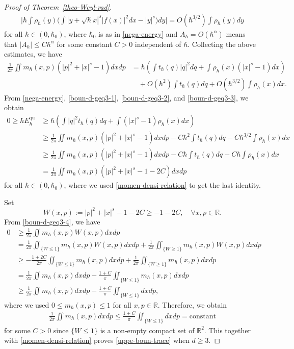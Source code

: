 \documentclass[%
11pt,  reqno]{amsart}
\theoremstyle{remarkstyle}
\newcommand{\1}{\hspace{0.2mm}\text{I}\hspace{0.2mm}}
\newcommand{\R}{\mathbb{R}}
\DeclareMathOperator*{\qua}{qu}
\numberwithin{equation}{section}
\numberwithin{theorem}{section}
\begin{document}
\begin{proof}[Proof of Theorem~\ref{theo-Weyl-rad}]
		\begin{align*}
			\Big|\hbar \int \rho_{\hbar}(y) \Big( \int |y+\sqrt{\hbar} x|^s|f(x)|^2 dx - |y|^s \Big) dy\Big| = O(\hbar^{3/2}) \int \rho_{\hbar}(y)dy
		\end{align*}
		for all $\hbar \in (0,\hbar_0)$, where $\hbar_0$ is as in \eqref{nega-energy} and $A_\hbar=O(\hbar^\alpha)$ means that $|A_\hbar|\leq C\hbar^\alpha$ for some constant $C>0$ independent of $\hbar$. Collecting the above estimates, we have
		\begin{align} 
			\frac{1}{2\pi}\iint m_{\hbar}(x,p) (|p|^2+|x|^s-1) dxdp &= \hbar \left(\int t_\hbar(q)|q|^2 dq + \int \rho_\hbar(x) (|x|^s-1) dx\right) \label{boun-d-geq3-3} \\
			&\quad + O(\hbar^2) \int t_\hbar(q) dq + O(\hbar^{3/2}) \int \rho_\hbar(x) dx. \nonumber
		\end{align}
		From \eqref{nega-energy}, \eqref{boun-d-geq3-1}, \eqref{boun-d-geq3-2}, and \eqref{boun-d-geq3-3}, we obtain
		\begin{align}
			0\geq \hbar E^{\qua}_{\hbar} &\geq \hbar \left(\int |q|^2 t_\hbar(q)dq + \int (|x|^s-1)\rho_{\hbar}(x) dx\right) \nonumber\\
			& \geq \frac{1}{2\pi}\iint m_{\hbar}(x,p)(|p|^2+|x|^s-1) dxdp  - C \hbar^2 \int t_{\hbar}(q) dq - C\hbar^{3/2} \int \rho_{\hbar}(x) dx \nonumber\\
			&\geq \frac{1}{2\pi}\iint m_{\hbar}(x,p)(|p|^2+|x|^s-1) dxdp  - C \hbar \int t_{\hbar}(q) dq - C\hbar \int \rho_{\hbar}(x) dx \nonumber\\
			&= \frac{1}{2\pi}\iint m_{\hbar}(x,p)(|p|^2+|x|^s-1-2C) dxdp \label{boun-d-geq3-4}
		\end{align}
		for all $\hbar \in (0,\hbar_0)$, where we used \eqref{momen-densi-relation} to get the last identity.
		
		Set $$W(x,p):= |p|^2+|x|^s-1-2C \geq -1-2C, \quad \forall x,p \in \R.$$ From \eqref{boun-d-geq3-4}, we have
		\begin{align*}
			0 &\geq \frac{1}{2\pi}\iint m_{\hbar}(x,p) W(x,p) dxdp \\
			&= \frac{1}{2\pi}\iint_{\{W\leq 1\}} m_{\hbar}(x,p) W(x,p) dxdp + \frac{1}{2\pi}\iint_{\{W\geq 1\}} m_{\hbar}(x,p) W(x,p) dxdp \\
			&\geq -\frac{1+2C}{2\pi} \iint_{\{W\leq 1\}} m_\hbar(x,p) dx dp + \frac{1}{2\pi}\iint_{\{W\geq 1\}} m_{\hbar}(x,p)dxdp \\
			&= \frac{1}{2\pi}\iint m_{\hbar}(x,p) dxdp -\frac{1+C}{\pi} \iint_{\{W\leq 1\}} m_{\hbar}(x,p)dxdp \\
			&\geq \frac{1}{2\pi}\iint m_{\hbar}(x,p) dxdp - \frac{1+C}{\pi} \iint_{\{W\leq 1\}} dxdp,
		\end{align*}
		where we used $0\leq m_\hbar(x,p)\leq 1$ for all $x,p \in \R$. Therefore, we obtain
		\begin{align} \label{boun-m}
			\frac{1}{2\pi}\iint m_{\hbar}(x,p) dxdp \leq \frac{1+C}{\pi} \iint_{\{W\leq 1\}} dxdp = \text{constant}
		\end{align}
		for some $C>0$ since $\{W\leq 1\}$ is a non-empty compact set of $\R^2$. This together with \eqref{momen-densi-relation} proves \eqref{uppe-boun-trace} when $d\geq 3$.  
		

\end{proof}
\end{document}
